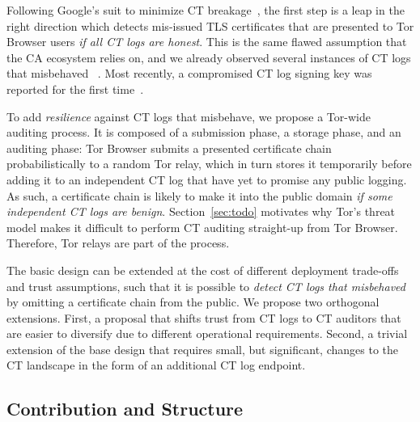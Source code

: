 Following Google's suit to minimize CT breakage~\cite{does-ct-break-the-web},
the first step is a leap in the right direction which detects mis-issued TLS
certificates that are presented to Tor Browser users \emph{if all CT logs are
honest}.  This is the same flawed assumption that the CA ecosystem relies on,
and we already observed several instances of CT logs that misbehaved~%
	\cite{izenpe-disqualified,venafi-disqualified,gdca1-omission}.
Most recently, a compromised CT log signing key was reported for the first
time~\cite{digicert-log-compromised}.

To add \emph{resilience} against CT logs that misbehave, we propose a Tor-wide
auditing process.  It is composed of a submission phase, a storage phase, and
an auditing phase:
	Tor Browser submits a presented certificate chain probabilistically to
		a random Tor relay,
	which in turn stores it temporarily before adding it to an independent CT
		log that have yet to promise any public logging.
As such, a certificate chain is likely to make it into the public domain
\emph{if some independent CT logs are benign}.  Section~\ref{sec:todo} motivates
why Tor's threat model makes it difficult to perform CT auditing straight-up
from Tor Browser.  Therefore, Tor relays are part of the process.

The basic design can be extended at the cost of different deployment trade-offs
and trust assumptions, such that it is possible to \emph{detect CT logs that
misbehaved} by omitting a certificate chain from the public.  We propose two
orthogonal extensions.  First, a proposal that shifts trust from CT logs to CT
auditors that are easier to diversify due to different operational
requirements.  Second, a trivial extension of the base design that requires
small, but significant, changes to the CT landscape in the form of an
additional CT log endpoint.

\subsection{Contribution and Structure}
